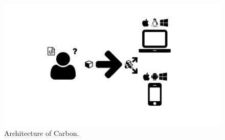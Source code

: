 \begin{figure}
  \centering
  \includegraphics[width=\textwidth, page=28, trim=0cm 0cm 12cm 0cm, clip=true]{images/Figures.pdf}
  \caption{Architecture of Carbon.}
  \label{fig:carbon-architecture}
\end{figure}


